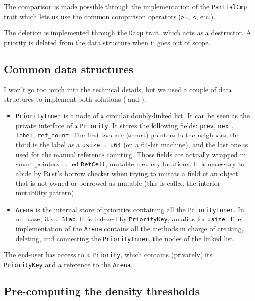 \documentclass[12pt]{article}
\begin{document}
The comparison is made possible through the implementation of the \lstinline{PartialCmp} trait which lets us use the common comparison operators (\lstinline{>=}, \lstinline{<}, etc.).

The deletion is implemented through the \lstinline{Drop} trait, which acts as a destructor. A priority is deleted from the data structure when it goes out of scope.

\subsection{Common data structures}

I won't go too much into the technical details, but we used a couple of data structures to implement both solutions (\cite{10.5555/647912.740822} and \cite{10.1145/28395.28434}).

\begin{itemize}
  \item \lstinline{PriorityInner} is a node of a circular doubly-linked list. It can be seen as the private interface of a \lstinline{Priority}. It stores the following fields: \lstinline{prev}, \lstinline{next}, \lstinline{label}, \lstinline{ref_count}. The first two are (smart) pointers to the neighbors, the third is the label as a \lstinline{usize = u64} (on a 64-bit machine), and the last one is used for the manual reference counting. Those fields are actually wrapped in smart pointers called \lstinline{RefCell}, mutable memory locations. It is necessary to abide by Rust's borrow checker when trying to mutate a field of an object that is not owned or borrowed as mutable (this is called the interior mutability pattern).
  \item \lstinline{Arena} is the internal store of priorities containing all the \lstinline{PriorityInner}. In our case, it's a \lstinline{Slab}. It is indexed by \lstinline{PriorityKey}, an alias for \lstinline{usize}. The implementation of the \lstinline{Arena} contains all the methods in charge of creating, deleting, and connecting the \lstinline{PriorityInner}, the nodes of the linked list.
\end{itemize}

The end-user has access to a \lstinline{Priority}, which contains (privately) its \lstinline{PriorityKey} and a reference to the \lstinline{Arena}.

\subsection{Pre-computing the density thresholds} \label{precompute}
\end{document}
